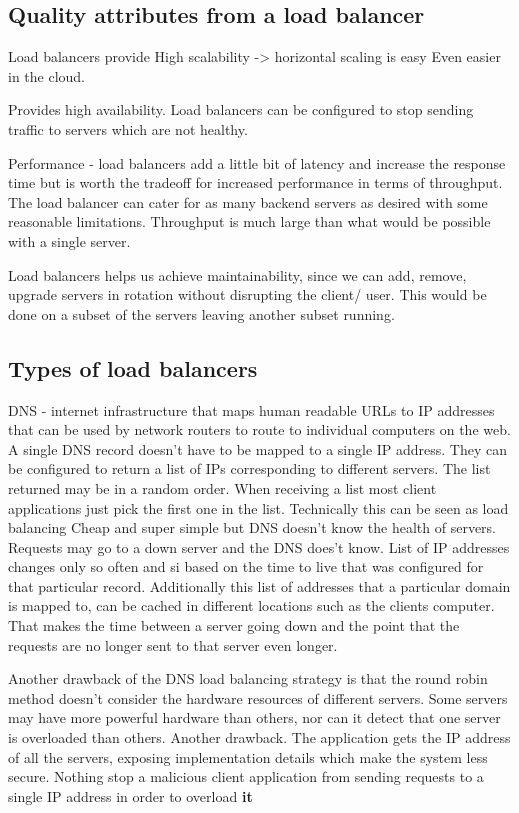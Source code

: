 \documentclass[a4paper, 11pt]{book}
\begin{document}
    \subsection{Quality attributes from a load balancer}
    Load balancers provide
    High scalability -> horizontal scaling is easy
    Even easier in the cloud.

    Provides high availability.
    Load balancers can be configured to stop sending traffic to servers which are not healthy.

    Performance - load balancers add a little bit of latency and increase the response time but is worth the tradeoff for increased performance in terms of throughput.
    The load balancer can cater for as many backend servers as desired with some reasonable limitations.
    Throughput is much large than what would be possible with a single server.

    Load balancers helps us achieve maintainability, since we can add, remove, upgrade servers in rotation without disrupting the client/ user.
    This would be done on a subset of the servers leaving another subset running.

    \subsection{Types of load balancers}
    DNS - internet infrastructure that maps human readable URLs to IP addresses that can be used by network routers to route to individual computers on the web.
    A single DNS record doesn't have to be mapped to a single IP address.
    They can be configured to return a list of IPs corresponding to different servers.
    The list returned may be in a random order.
    When receiving a list most client applications just pick the first one in the list.
    Technically this can be seen as load balancing
    Cheap and super simple but DNS doesn't know the health of servers.
    Requests may go to a down server and the DNS does't know.
    List of IP addresses changes only so often and si based on the time to live that was configured for that particular record.
    Additionally this list of addresses that a particular domain is mapped to, can be cached in different locations such as the clients computer.
    That makes the time between a server going down and the point that the requests are no longer sent to that server even longer.

    Another drawback of the DNS load balancing strategy is that the round robin method doesn't consider the hardware resources of different servers.
    Some servers may have more powerful hardware than others, nor can it detect that one server is overloaded than others.
    Another drawback.
    The application gets the IP address of all the servers, exposing implementation details which make the system less secure.
    Nothing stop a malicious client application from sending requests to a single IP address in order to overload \textbf{it}
\end{document}
